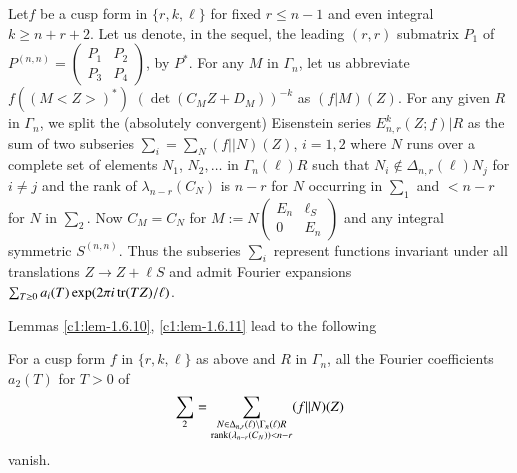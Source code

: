 Let\pageoriginale $f$ be a cusp form in $\{r,k,\ell\}$ for fixed
$r\leq n-1$ and even integral $k\geq n+r+2$. Let us denote, in the
sequel, the leading $(r,r)$ submatrix $P_{1}$ of
$P^{(n,n)}=\left(\begin{smallmatrix} P_{1} & P_{2}\\ P_{3} & P_{4}
\end{smallmatrix}\right)$, by $P^{\ast}$. For any $M$ in $\Gamma_{n}$,
let us abbreviate $f((M<Z>)^{\ast})$ $(\det (C_{M}Z+D_{M}))^{-k}$ as
$(f|M)(Z)$. For any given $R$ in $\Gamma_{n}$, we split the
(absolutely convergent) Eisenstein series $E^{k}_{n,r}(Z;f)|R$ as the
sum of two subseries $\sum\limits_{i}=\sum\limits_{N}(f||N)(Z)$,
$i=1,2$ where $N$ runs over a complete set of elements $N_{1}$,
$N_{2},\ldots$ in $\Gamma_{n}(\ell)R$ such that $N_{i}\not\in
\Delta_{n,r}(\ell)N_{j}$ for $i\neq j$ and the rank of
$\lambda_{n-r}(C_{N})$ is $n-r$ for $N$ occurring in $\sum\limits_{1}$
and $<n-r$ for $N$ in $\sum\limits_{2}$. Now $C_{M}=C_{N}$ for
$M:=N\left(\begin{smallmatrix} E_{n} & \ell_{S}\\ 0 & E_{n}
\end{smallmatrix}\right)$ and any integral symmetric $S^{(n,n)}$. Thus
the subseries $\sum\limits_{i}$ represent functions invariant under
all translations $Z\to Z+\ell S$ and admit Fourier expansions
$\sum_{T\geq 0}a_{i}(T)\exp(2\pi i\operatorname{tr}(TZ)/\ell)$. 

Lemmas \ref{c1:lem-1.6.10}, \ref{c1:lem-1.6.11} lead to the following

\setcounter{subprop}{11}
\begin{subprop}\label{c1:prop-1.6.12}
For a cusp form $f$ in $\{r,k,\ell\}$ as above and $R$ in
$\Gamma_{n}$, all the Fourier coefficients $a_{2}(T)$ for $T>0$ of 
$$
\sum\limits_{2}=\sum_{\substack{N\in\Delta_{n,r}(\ell)\backslash
    \Gamma_{n}(\ell)R\\ \operatorname{rank} (\lambda_{n-r}(C_{N}))<n-r}}(f||N)(Z)
$$ 
vanish.
\end{subprop}

